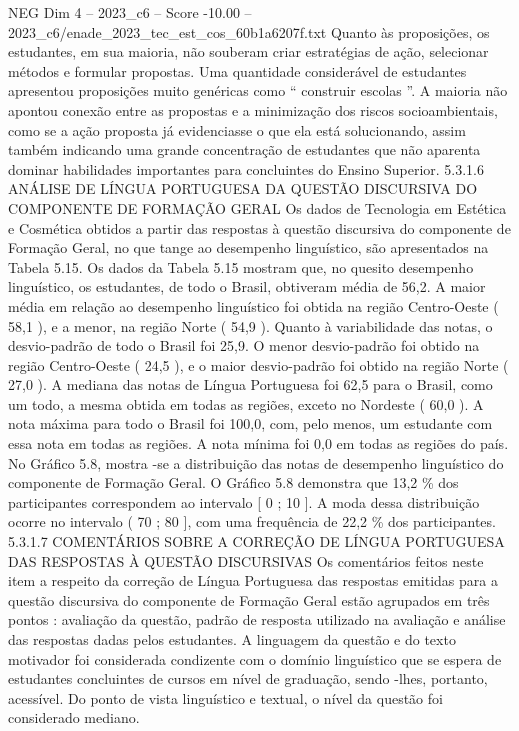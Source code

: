\begin{textsample}{NEG Dim 4 – 2023\_c6 – Score -10.00 – 2023\_c6/enade\_2023\_tec\_est\_cos\_60b1a6207f.txt}
Quanto às proposições, os estudantes, em sua maioria, não souberam criar estratégias de ação, selecionar métodos e formular propostas.
Uma quantidade considerável de estudantes apresentou proposições muito genéricas como “ construir escolas ”.
A maioria não apontou conexão entre as propostas e a minimização dos riscos socioambientais, como se a ação proposta já evidenciasse o que ela está solucionando, assim também indicando uma grande concentração de estudantes que não aparenta dominar habilidades importantes para concluintes do Ensino Superior. 5.3.1.6 ANÁLISE DE LÍNGUA PORTUGUESA DA QUESTÃO DISCURSIVA DO COMPONENTE DE FORMAÇÃO GERAL Os dados de Tecnologia em Estética e Cosmética obtidos a partir das respostas à questão discursiva do componente de Formação Geral, no que tange ao desempenho linguístico, são apresentados na Tabela 5.15.
Os dados da Tabela 5.15 mostram que, no quesito desempenho linguístico, os estudantes, de todo o Brasil, obtiveram média de 56,2.
A maior média em relação ao desempenho linguístico foi obtida na região Centro-Oeste ( 58,1 ), e a menor, na região Norte ( 54,9 ).
Quanto à variabilidade das notas, o desvio-padrão de todo o Brasil foi 25,9.
O menor desvio-padrão foi obtido na região Centro-Oeste ( 24,5 ), e o maior desvio-padrão foi obtido na região Norte ( 27,0 ).
A mediana das notas de Língua Portuguesa foi 62,5 para o Brasil, como um todo, a mesma obtida em todas as regiões, exceto no Nordeste ( 60,0 ).
A nota máxima para todo o Brasil foi 100,0, com, pelo menos, um estudante com essa nota em todas as regiões.
A nota mínima foi 0,0 em todas as regiões do país.
No Gráfico 5.8, mostra -se a distribuição das notas de desempenho linguístico do componente de Formação Geral.
O Gráfico 5.8 demonstra que 13,2 \% dos participantes correspondem ao intervalo [ 0 ; 10 ].
A moda dessa distribuição ocorre no intervalo ( 70 ; 80 ], com uma frequência de 22,2 \% dos participantes. 5.3.1.7 COMENTÁRIOS SOBRE A CORREÇÃO DE LÍNGUA PORTUGUESA DAS RESPOSTAS À QUESTÃO DISCURSIVAS Os comentários feitos neste item a respeito da correção de Língua Portuguesa das respostas emitidas para a questão discursiva do componente de Formação Geral estão agrupados em três pontos : avaliação da questão, padrão de resposta utilizado na avaliação e análise das respostas dadas pelos estudantes.
A linguagem da questão e do texto motivador foi considerada condizente com o domínio linguístico que se espera de estudantes concluintes de cursos em nível de graduação, sendo -lhes, portanto, acessível.
Do ponto de vista linguístico e textual, o nível da questão foi considerado mediano.

\end{textsample}

